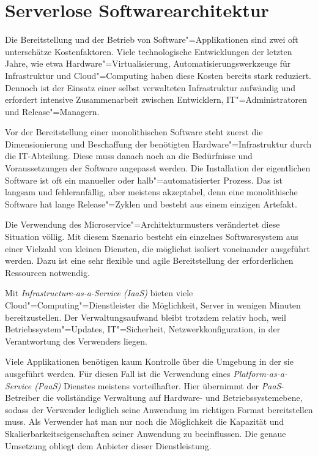 \chapter{Serverlose Softwarearchitektur}

Die Bereitstellung und der Betrieb von Software"=Applikationen sind zwei oft unterschätze Kostenfaktoren. Viele technologische Entwicklungen der letzten Jahre, wie etwa Hardware"=Virtualisierung, Automatisierungswerkzeuge für Infrastruktur und Cloud"=Computing haben diese Kosten bereits stark reduziert. Dennoch ist der Einsatz einer selbst verwalteten Infrastruktur aufwändig und erfordert intensive Zusammenarbeit zwischen Entwicklern, IT"=Administratoren und Release"=Managern.

Vor der Bereitstellung einer monolithischen Software steht zuerst die Dimensionierung und Beschaffung der benötigten Hardware"=Infrastruktur durch die IT-Abteilung. Diese muss danach noch an die Bedürfnisse und Voraussetzungen der Software angepasst werden. Die Installation der eigentlichen Software ist oft ein manueller oder halb"=automatisierter Prozess. Das ist langsam und fehleranfällig, aber meistens akzeptabel, denn eine monolithische Software hat lange Release"=Zyklen und besteht aus einem einzigen Artefakt.

Die Verwendung des Microservice"=Architekturmusters verändertet diese Situation völlig. Mit diesem Szenario besteht ein einzelnes Softwaresystem aus einer Vielzahl von kleinen Diensten, die möglichst isoliert voneinander ausgeführt werden. Dazu ist eine sehr flexible und agile Bereitstellung der erforderlichen Ressourcen notwendig.

Mit \textit{Infrastructure-as-a-Service (IaaS)} bieten viele Cloud"=Computing"=Dienstleister die Möglichkeit, Server in wenigen Minuten bereitzustellen. Der Verwaltungsaufwand bleibt trotzdem relativ hoch, weil Betriebssystem"=Updates, IT"=Sicherheit, Netzwerkkonfiguration, \usw in der Verantwortung des Verwenders liegen.

Viele Applikationen benötigen kaum Kontrolle über die Umgebung in der sie ausgeführt werden. Für diesen Fall ist die Verwendung eines \textit{Platform-as-a-Service (PaaS)} Dienstes meistens vorteilhafter. Hier übernimmt der \textit{PaaS}-Betreiber die vollständige Verwaltung auf Hardware- und Betriebssystemebene, sodass der Verwender lediglich seine Anwendung im richtigen Format bereitstellen muss. Als Verwender hat man nur noch die Möglichkeit die Kapazität und Skalierbarkeitseigenschaften seiner Anwendung zu beeinflussen. Die genaue Umsetzung obliegt dem Anbieter dieser Dienstleistung.

